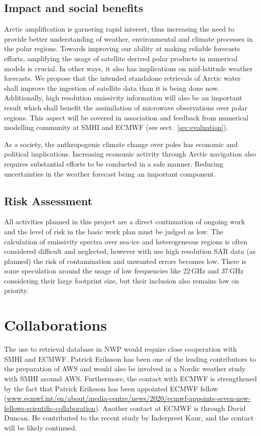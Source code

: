\documentclass[12pt,oneside,a4paper]{article}
\begin{document}
\subsection{Impact and social benefits}
%
\label{sec:impact}
Arctic amplification is garnering rapid interest, thus increasing the need to provide better understanding of weather, environmental and climate processes in the polar regions. Towards improving our ability at making reliable forecasts efforts, amplifying the usage of satellite derived polar products in numerical models is crucial. In other ways, it also has implications on mid-latitude weather forecasts. We propose that the intended standalone retrievals of Arctic water shall improve the ingestion of satellite data than it is being done now. Additionally, high resolution emissivity information will also be an important result which shall benefit the assimilation of microwave observations over polar regions. This aspect will be covered in association and feedback from numerical modelling community at SMHI and ECMWF (see sect.~\ref{sec:evaluation}).

As a society, the anthropogenic climate change over poles has economic and political implications. Increasing economic activity through Arctic navigation also requires substantial efforts to be conducted in a safe manner. Reducing uncertainties in the weather forecast being an important component. 

 
\subsection{Risk Assessment}
%
\label{sec:risk}
All activities planned in this project are a direct continuation of ongoing work and the level of risk in the basic work plan must be judged as low. The calculation of emissivity spectra over sea-ice and heterogeneous regions is often considered difficult and neglected, however with use high resolution SAR data (as planned) the risk of contamination and unwanted errors becomes low. There is some speculation around the usage of low frequencies like 22\,GHz and 37\,GHz considering their large footprint size, but their inclusion also remains low on priority. 

\section{Collaborations}
%
The use to retrieval database in NWP would require close cooperation with SMHI and ECMWF. Patrick Eriksson has been one of the leading contributors to the preparation of AWS and would also be involved in a Nordic weather study with SMHI around AWS. Furthermore, the contact with ECMWF is strengthened by the fact that Patrick Eriksson has been appointed ECMWF  fellow ({\footnotesize \url{www.ecmwf.int/en/about/media-centre/news/2020/ecmwf-appoints-seven-new-fellows-scientific-collaboration}}). Another contact at ECMWF is through David Duncan. He contributed to the recent study by Inderpreet Kaur, and the contact will be likely continued. 
\end{document}
